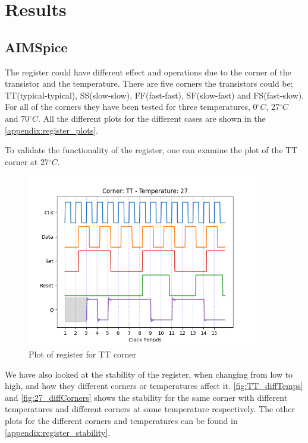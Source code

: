 \section{Results}
\label{sec:results}

\subsection{AIMSpice}

The register could have different effect and operations due to the corner of the transistor and the temperature. There are five corners the transistors could be; TT(typical-typical), SS(slow-slow), FF(fast-fast), SF(slow-fast) and FS(fast-slow).  For all of the corners they have been tested for three temperatures, 0$^\circ C$, 27$^\circ C$ and 70$^\circ C$. All the different plots for the different cases are shown in the \autoref{appendix:register_plots}. 

To validate the functionality of the register, one can examine the plot of the TT corner at 27$^\circ C$. 

\begin{figure}[H]
    \centering
    \includegraphics[width=0.9\textwidth]{Figures/Aimspice_Plots/TT_27.png}
    \caption{Plot of register for TT corner}
    \label{fig:result_TT27}
\end{figure}

We have also looked at the stability of the register, when changing from low to high, and how they different corners or temperatures affect it. \autoref{fig:TT_diffTemps} and \autoref{fig:27_diffCorners} shows the stability for the same corner with different temperatures and different corners at same temperature respectively. The other plots for the different corners and temperatures can be found in \autoref{appendix:register_stability}.

